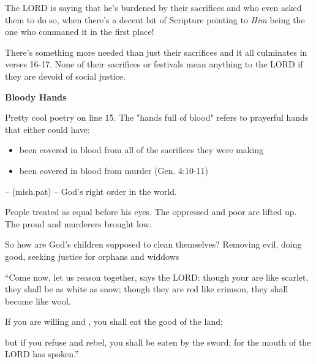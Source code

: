 \documentclass[11pt]{article}
\newcommand{\hebrew}[1]{\bgroup\hebrewfont\RL{#1}\egroup}
\begin{document}
The LORD is saying that he's burdened by their sacrifices and who even asked them to do so, when there's a decent
bit of Scripture pointing to \textit{Him} being the one who commaned it in the first place!

{\vspace{1em}}
There's something more needed than just their sacrifices and it all culminates in verses 16-17. None of their sacrifices or festivals
mean anything to the LORD if they are devoid of social justice.

{\vspace{3em}}

{\large\bfseries Bloody Hands}
{\vspace{1em}}

Pretty cool poetry on line 15. The "hands full of blood" refers to prayerful hands that either could have:
\begin{itemize}
    \item been covered in blood from all of the sacrifices they were making
    \item been covered in blood from murder (Gen. 4:10-11)
\end{itemize}
{\vspace{1em}}

 – \hebrew{מִשְׁפָּט} (mish.pat) – God's right order in the world.

People treated as equal before his eyes. The oppressed and poor are lifted up. The proud and murderers brought low.

\vspace{1em}
So how are God's children supposed to clean themselves? Removing evil, doing good, seeking justice for orphans and widdows

\begin{biblicaloutline}[Isaiah 1:18-20]

    \begin{versesection}{2em}
 ``Come now, let us reason together, says the LORD:
\poetryline though your  are like scarlet,
\poetryline they shall be as white as snow;
though they are red like crimson,
\poetryline they shall become like wool.

 If you are willing and ,
\poetryline you shall eat the good of the land;

 but if you refuse and rebel,
\poetryline you shall be eaten by the sword;
\poetryline for the mouth of the LORD has spoken.''
    \end{versesection}

\end{biblicaloutline}
\end{document}
